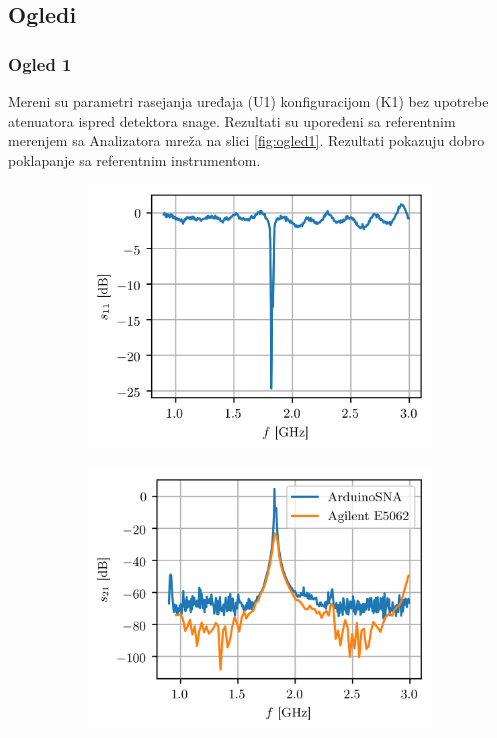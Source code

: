 \documentclass[a4paper, 12pt, diplomski]{etf}
\begin{document}
\subsection{Ogledi}

\subsubsection{Ogled 1}
Mereni su parametri rasejanja uređaja (U1) 
konfiguracijom (K1) bez upotrebe atenuatora ispred
detektora snage. Rezultati su upoređeni sa 
referentnim merenjem sa Analizatora mreža 
na slici \ref{fig:ogled1}. Rezultati pokazuju 
dobro poklapanje sa referentnim instrumentom.
%
\begin{figure}[ht!]
    \begin{subfigure}[b]{0.49\textwidth}
        \centering
        \includegraphics[width = 1\textwidth]{fig/s11_bpf.png}
        \label{fig:s11_bpf}
    \end{subfigure}
    \hfill
    \begin{subfigure}[b]{0.49\textwidth}
        \centering
        \includegraphics[width = 1\textwidth]{fig/s21_bpf.png}

\end{subfigure}
\end{figure}
\end{document}
